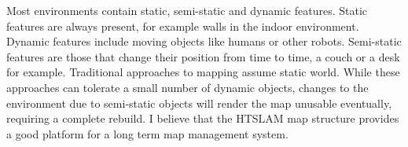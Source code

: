 Most environments contain static, semi-static and dynamic
features. Static features are always present, for example walls in the
indoor environment. Dynamic features include moving objects like
humans or other robots. Semi-static features are those that change
their position from time to time, a couch or a desk for
example. Traditional approaches to mapping assume static world. While
these approaches can tolerate a small number of dynamic objects,
changes to the environment due to semi-static objects will render the
map unusable eventually, requiring a complete rebuild. I believe that
the HTSLAM map structure provides a good platform for a long term map
management system.




